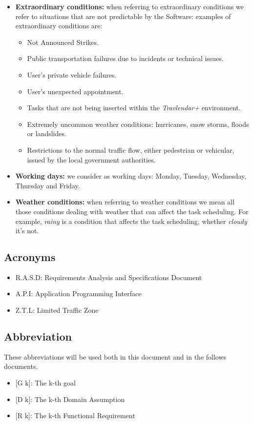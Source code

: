 \begin{itemize}
     \item \textbf{Extraordinary conditions:} when referring to extraordinary conditions we refer to situations that are not predictable by the Software: examples of extraordinary conditions are:
     \begin{itemize}
     \item Not Announced Strikes.
     \item Public transportation failures due to incidents or technical issues.
     \item User's private vehicle failures.
     \item User's unexpected appointment.
     \item Tasks that are not being inserted within the \emph{Travlendar+} environment.
     \item Extremely uncommon weather conditions: hurricanes, snow storms, floods or landslides.
     \item Restrictions to the normal traffic flow, either pedestrian or vehicular, issued by the local government authorities.
     \end{itemize}
     
     \item \textbf{Working days:} we consider as working days: Monday, Tuesday, Wednesday, Thursday and Friday.
 
     \item \textbf{Weather conditions:} when referring to weather conditions we mean all those conditions dealing with weather that can affect the task scheduling. For example, \emph{rainy} is a condition that affects the task scheduling, whether \emph{cloudy} it's not. 
     
\end{itemize}

\subsection{Acronyms}

\begin{itemize}
  \item R.A.S.D: Requirements Analysis and Specifications Document
  \item A.P.I: Application Programming Interface 
  
  \item Z.T.L: Limited Traffic Zone
\end{itemize}

\subsection{Abbreviation}
These abbreviations will be used both in this document and in the follows documents.

\begin{itemize}
	\item {[}G k{]}: The k-th goal
    \item {[}D k{]}: The k-th Domain Assumption
    \item {[}R k{]}: The k-th Functional Requirement
\end{itemize}
